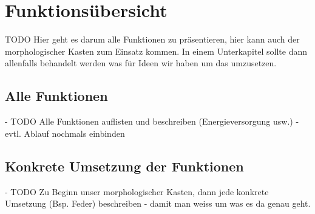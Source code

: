 \section{Funktionsübersicht}
TODO Hier geht es darum alle Funktionen zu präsentieren, hier kann auch der morphologischer Kasten zum Einsatz kommen.
In einem Unterkapitel sollte dann allenfalls behandelt werden was für Ideen wir haben um das umzusetzen.

\subsection{Alle Funktionen}
- TODO Alle Funktionen auflisten und beschreiben (Energieversorgung usw.) - evtl. Ablauf nochmals einbinden

\subsection{Konkrete Umsetzung der Funktionen}
- TODO Zu Beginn unser morphologischer Kasten, dann jede konkrete Umsetzung (Bsp. Feder) beschreiben - damit man weiss um was es da genau geht.
